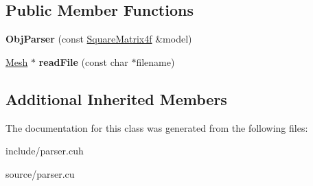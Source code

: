 \subsection*{Public Member Functions}
\begin{DoxyCompactItemize}
\item 
{\bfseries Obj\+Parser} (const \hyperlink{class_square_matrix4}{Square\+Matrix4f} \&model)\hypertarget{class_obj_parser_a877b7dd2e14babe156c75ae99da25df7}{}\label{class_obj_parser_a877b7dd2e14babe156c75ae99da25df7}

\item 
\hyperlink{class_mesh}{Mesh} $\ast$ {\bfseries read\+File} (const char $\ast$filename)\hypertarget{class_obj_parser_a09e546bab90c4c288f8643ace7e5c333}{}\label{class_obj_parser_a09e546bab90c4c288f8643ace7e5c333}

\end{DoxyCompactItemize}
\subsection*{Additional Inherited Members}


The documentation for this class was generated from the following files\+:\begin{DoxyCompactItemize}
\item 
include/parser.\+cuh\item 
source/parser.\+cu\end{DoxyCompactItemize}
